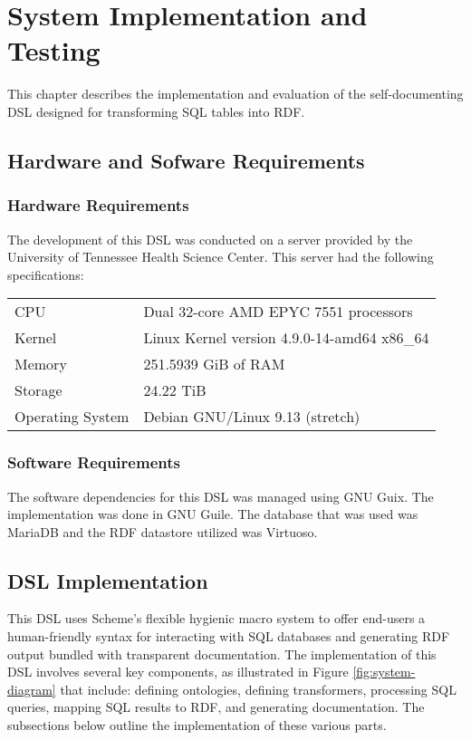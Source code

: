 \chapter{System Implementation and Testing}

This chapter describes the implementation and evaluation of the self-documenting DSL designed for transforming SQL tables into RDF.

\section{Hardware and Sofware Requirements}

\subsection{Hardware Requirements}

The development of this DSL was conducted on a server provided by the University of Tennessee Health Science Center.  This server had the following specifications:

\begin{center}
\begin{tabular}{ll}
CPU & Dual 32-core AMD EPYC 7551 processors\\
Kernel & Linux Kernel version 4.9.0-14-amd64 x86\_64\\
Memory & 251.5939 GiB of RAM\\
Storage & 24.22 TiB\\
Operating System & Debian GNU/Linux 9.13 (stretch)\\
\end{tabular}
\end{center}

\subsection{Software Requirements}

The software dependencies for this DSL was managed using GNU Guix.  The implementation was done in GNU Guile.  The database that was used was MariaDB and the RDF datastore utilized was Virtuoso.

\section{DSL Implementation}

This DSL uses Scheme's flexible hygienic macro system to offer end-users a human-friendly syntax for interacting with SQL databases and generating RDF output bundled with transparent documentation.  The implementation of this DSL involves several key components, as illustrated in Figure \ref{fig:system-diagram} that include: defining ontologies, defining transformers, processing SQL queries, mapping SQL results to RDF, and generating documentation.  The subsections below outline the implementation of these various parts.

